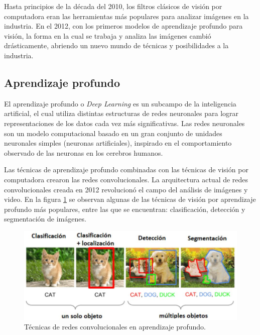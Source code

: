 
Hasta principios de la década del 2010, los filtros clásicos de visión por computadora eran las herramientas más populares para analizar imágenes en la industria. En el 2012, con los primeros modelos de aprendizaje profundo para visión, la forma en la cual se trabaja y analiza las imágenes cambió drásticamente, abriendo un nuevo mundo de técnicas y posibilidades a la industria.

\newpage

\subsection{Aprendizaje profundo}

El aprendizaje profundo o \textit{Deep Learning} \citep{DEEP_LEARNING} es un subcampo de la inteligencia artificial, el cual utiliza distintas estructuras de redes neuronales para lograr representaciones de los datos cada vez más significativas. Las redes neuronales son un modelo computacional basado en un gran conjunto de unidades neuronales simples (neuronas artificiales), inspirado en el comportamiento observado de las neuronas en los cerebros humanos. 

Las técnicas de aprendizaje profundo combinadas con las técnicas de visión por computadora crearon las redes convolucionales. La arquitectura actual de redes convolucionales creada en 2012 revolucionó el campo del análisis de imágenes y video. En la figura \ref{fig:visionDeepLearning} se observan algunas de las técnicas de visión por aprendizaje profundo más populares, entre las que se encuentran: clasificación, detección y segmentación de imágenes.

\begin{figure}[ht]
	\centering
	\includegraphics[scale=.7]{./Figures/visionDeepLearning.jpg}
	\caption{Técnicas de redes convolucionales en aprendizaje profundo\protect\footnotemark.}
	\label{fig:visionDeepLearning}
\end{figure}

